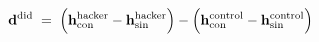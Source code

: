 \documentclass[12pt]{article}
\begin{document}
\color{tinta}
\(\displaystyle \mathbf{d}^{\mathrm{did}} \;=\; \Bigl(\mathbf{h}^{\mathrm{hacker}}_{\mathrm{con}}-\mathbf{h}^{\mathrm{hacker}}_{\mathrm{sin}}\Bigr)-\Bigl(\mathbf{h}^{\mathrm{control}}_{\mathrm{con}}-\mathbf{h}^{\mathrm{control}}_{\mathrm{sin}}\Bigr)\)
\end{document}
